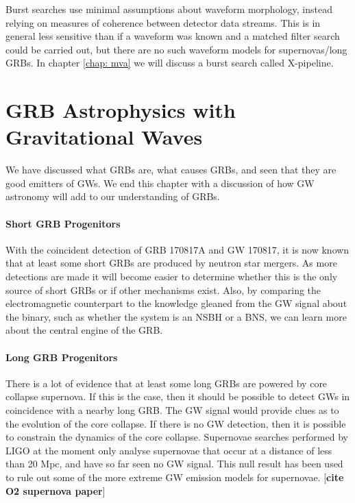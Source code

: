 \documentclass[11pt]{cuthesis}
\newcommand{\xpfs}{X-pipeline. }
\begin{document}
Burst searches use minimal assumptions about waveform morphology, instead relying on measures of coherence between detector data streams. This is in general less sensitive than if a waveform was known and a matched filter search could be carried out, but there are no such waveform models for supernovas/long GRBs. In chapter \ref{chap: mva} we will discuss a burst search called \xpfs 

\section{GRB Astrophysics with Gravitational Waves}
We have discussed what GRBs are, what causes GRBs, and seen that they are good emitters of GWs. We end this chapter with a discussion of how GW astronomy will add to our understanding of GRBs. 

\paragraph{Short GRB Progenitors}
With the coincident detection of GRB 170817A and GW 170817, it is now known that at least some short GRBs are produced by neutron star mergers. As more detections are made it will become easier to determine whether this is the only source of short GRBs or if other mechanisms exist. Also, by comparing the electromagnetic counterpart to the knowledge gleaned from the GW signal about the binary, such as whether the system is an NSBH or a BNS, we can learn more about the central engine of the GRB. 

\paragraph{Long GRB Progenitors}
There is a lot of evidence that at least some long GRBs are powered by core collapse supernova. If this is the case, then it should be possible to detect GWs in coincidence with a nearby long GRB. The GW signal would provide clues as to the evolution of the core collapse. If there is no GW detection, then it is possible to constrain the dynamics of the core collapse. Supernovae searches performed by LIGO at the moment only analyse supernovae that occur at a distance of less than 20 Mpc, and have so far seen no GW signal. This null result has been used to rule out some of the more extreme GW emission models for supernovae. [\textbf{cite O2 supernova paper}]
\end{document}
